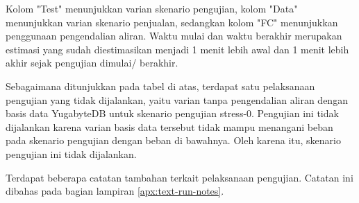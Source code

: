 Kolom "Test" menunjukkan varian skenario pengujian, kolom "Data" menunjukkan varian skenario penjualan, sedangkan kolom "FC" menunjukkan penggunaan pengendalian aliran. Waktu mulai dan waktu berakhir merupakan estimasi yang sudah diestimasikan menjadi 1 menit lebih awal dan 1 menit lebih akhir sejak pengujian dimulai/ berakhir.

Sebagaimana ditunjukkan pada tabel di atas, terdapat satu pelaksanaan pengujian yang tidak dijalankan, yaitu varian tanpa pengendalian aliran dengan basis data YugabyteDB untuk skenario pengujian stress-0. Pengujian ini tidak dijalankan karena varian basis data tersebut tidak mampu menangani beban pada skenario pengujian dengan beban di bawahnya. Oleh karena itu, skenario pengujian ini tidak dijalankan.

Terdapat beberapa catatan tambahan terkait pelaksanaan pengujian. Catatan ini dibahas pada bagian lampiran \ref{apx:text-run-notes}.
